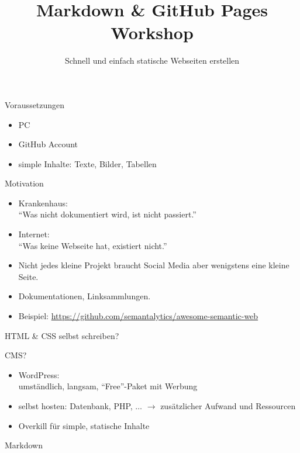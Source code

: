 \documentclass[14pt,aspectratio=1610]{beamer}
\title{Markdown \& GitHub Pages Workshop}
\subtitle{Schnell und einfach statische Webseiten erstellen}
\begin{document}
\begin{frame}
\titlepage
\end{frame}

\begin{frame}{Voraussetzungen}
\begin{itemize}
\item PC
\item GitHub Account
\item simple Inhalte: Texte, Bilder, Tabellen
\end{itemize}
\end{frame}

\begin{frame}{Motivation}
\begin{itemize}
\item Krankenhaus:\\\enquote{Was nicht dokumentiert wird, ist nicht passiert.}
\item Internet:\\\enquote{Was keine Webseite hat, existiert nicht.}
\item Nicht jedes kleine Projekt braucht Social Media aber wenigstens eine kleine Seite.
\item Dokumentationen, Linksammlungen.
\item Beispiel: \url{https://github.com/semantalytics/awesome-semantic-web}
\end{itemize}
\end{frame}

\begin{frame}{HTML \& CSS selbst schreiben?}
\scriptsize

\end{frame}

\begin{frame}{CMS?}
\begin{itemize}
\item WordPress:\\umständlich, langsam, \enquote{Free}-Paket mit Werbung
\item selbst hosten: Datenbank, PHP, $\ldots$ $\rightarrow$ zusätzlicher Aufwand und Ressourcen
\item Overkill für simple, statische Inhalte
\end{itemize}
\end{frame}

\begin{frame}[fragile]{Markdown}
\small

\end{frame}
\end{document}
